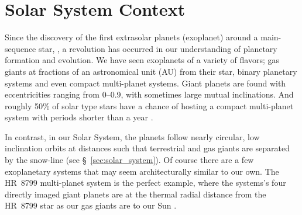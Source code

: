 \section{Solar System Context}\label{sec:ch1_context}

    Since the discovery of the first extrasolar planets (exoplanet) around a main-sequence star, \citep[HD~114762~b and 51~Pegasi~b,][respectively]{Latham1989, Mayor1995}, a revolution has occurred in our understanding of planetary formation and evolution. We have seen exoplanets of a variety of flavors; gas giants at fractions of an astronomical unit (AU) from their star, binary planetary systems and even compact multi-planet systems. Giant planets are found with eccentricities ranging from 0--0.9, with sometimes large mutual inclinations. And roughly 50\% of solar type stars have a chance of hosting a compact multi-planet system with periods shorter than a year \citep[see review by][]{Winn2015}. 
    
    In contrast, in our Solar System, the planets follow nearly circular, low inclination orbits at distances such that terrestrial and gas giants are separated by the snow-line (see \S~\ref{sec:solar_system}). Of course there are a few exoplanetary systems that may seem architecturally similar to our own. The HR~8799 multi-planet system is the perfect example, where the systems's four directly imaged giant planets are at the thermal radial distance from the HR~8799 star as our gas giants are to our Sun \citep{Marois2010}. 
    

